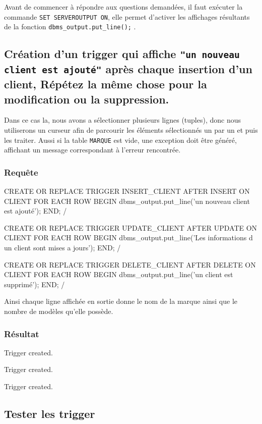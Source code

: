 \documentclass[•]{article}
\begin{document}
\def\reportnumber{5}
\def\reporttitle{TRIGGERS}



Avant de commencer à répondre aux questions demandées, il faut exécuter la commande \texttt{SET SERVEROUTPUT ON}, elle permet d'activer les affichages résultants de la fonction \texttt{dbms\_output.put\_line();} .

\subsection{Création d'un trigger qui affiche \texttt{"un nouveau client est ajouté"} après chaque insertion d'un client,
Répétez la même chose pour la modification ou la suppression.}
Dans ce cas la, nous avons a sélectionner plusieurs lignes (tuples), donc nous utiliserons un curseur afin de parcourir les éléments sélectionnés un par un et puis les traiter.
Aussi si la table \texttt{MARQUE} est vide, une exception doit être généré, affichant un message correspondant à l'erreur rencontrée.

\subsubsection{Requête}
\begin{sql}
CREATE OR REPLACE TRIGGER INSERT_CLIENT 
AFTER INSERT ON CLIENT 
FOR EACH ROW
BEGIN
	dbms_output.put_line('un nouveau client est ajouté');
END;
/


CREATE OR REPLACE TRIGGER UPDATE_CLIENT 
AFTER UPDATE ON CLIENT 
FOR EACH ROW
BEGIN
	dbms_output.put_line('Les informations d un client sont mises a jours');
END;
/


CREATE OR REPLACE TRIGGER DELETE_CLIENT 
AFTER DELETE ON CLIENT 
FOR EACH ROW
BEGIN
	dbms_output.put_line('un client est supprimé');
END;
/
\end{sql}

Ainsi chaque ligne affichée en sortie donne le nom de la marque ainsi que le nombre de modèles qu'elle possède.
\subsubsection{Résultat}
\begin{sql}
Trigger created.

Trigger created.

Trigger created.
\end{sql}

\subsection{Tester les trigger}
\end{document}
